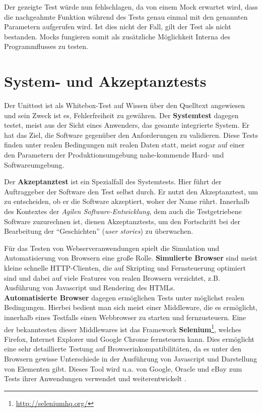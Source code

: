   Der gezeigte Test würde nun fehlschlagen, da von einem Mock erwartet wird, dass die nachgeahmte Funktion während des Tests genau einmal mit den genannten Parametern aufgerufen wird. Ist dies nicht der Fall, gilt der Test als nicht bestanden. Mocks fungieren somit als zusätzliche Möglichkeit Interna des Programmflusses zu testen.

\section{System- und Akzeptanztests}
\label{sec:acceptance}
Der Unittest ist als Whitebox-Test auf Wissen über den Quelltext angewiesen und sein Zweck ist es, Fehlerfreiheit zu gewähren. Der \textbf{Systemtest} dagegen testet, meist aus der Sicht eines Anwenders, das gesamte integrierte System. Er hat das Ziel, die Software gegenüber den Anforderungen zu validieren. Diese Tests finden unter realen Bedingungen mit realen Daten statt, meist sogar auf einer den Parametern der Produktionsumgebung nahe-kommende Hard- und Softwareumgebung.

Der \textbf{Akzeptanztest} ist ein Spezialfall des Systemtests. Hier führt der Auftraggeber der Software den Test selbst durch. Er nutzt den Akzeptanztest, um zu entscheiden, ob er die Software akzeptiert, woher der Name rührt.
Innerhalb des Kontextes der \textit{Agilen Software-Entwicklung}, dem auch die Testgetriebene Software zuzurechnen ist, dienen Akzeptanztests, um den Fortschritt bei der Bearbeitung der "`Geschichten"' (\textit{user stories}) zu überwachen.

Für das Testen von Webserveranwendungen spielt die Simulation und Automatisierung von Browsern eine große Rolle. \textbf{Simulierte Browser} sind meist kleine schnelle HTTP-Clienten, die auf Skripting und Fernsteuerung optimiert sind und dabei auf viele Features von realen Browsern verzichtet, z.B. Ausführung von Javascript und Rendering des HTMLs. \\
\textbf{Automatisierte Browser} dagegen ermöglichen Tests unter möglichst realen Bedingungen. Hierbei bedient man sich meist einer Middleware, die es ermöglicht, innerhalb eines Testfalls einen Webbrowser zu starten und fernzusteuern. Eine der bekanntesten dieser Middlewares ist das Framework \textbf{Selenium}\footnote{\url{http://seleniumhq.org/}}, welches Firefox, Internet Explorer und Google Chrome fernsteuern kann. Dies ermöglicht eine sehr detaillierte Testung auf Browserinkompatibilitäten, da es unter den Browsern gewisse Unterschiede in der Ausführung von Javascript und Darstellung von Elementen gibt. Dieses Tool wird u.a. von Google, Oracle und eBay zum Tests ihrer Anwendungen verwendet und weiterentwickelt \citep{selenium_hq_selenium_2010}.
